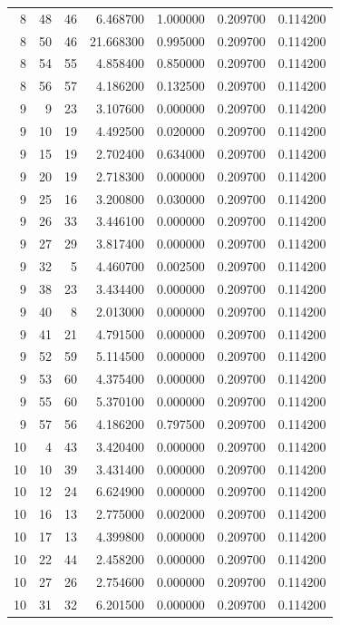 \begin{table}
\begin{tabular}{rrrrrrr}
8 & 48 & 46 & 6.468700 & 1.000000 & 0.209700 & 0.114200 \\
8 & 50 & 46 & 21.668300 & 0.995000 & 0.209700 & 0.114200 \\
8 & 54 & 55 & 4.858400 & 0.850000 & 0.209700 & 0.114200 \\
8 & 56 & 57 & 4.186200 & 0.132500 & 0.209700 & 0.114200 \\
9 & 9 & 23 & 3.107600 & 0.000000 & 0.209700 & 0.114200 \\
9 & 10 & 19 & 4.492500 & 0.020000 & 0.209700 & 0.114200 \\
9 & 15 & 19 & 2.702400 & 0.634000 & 0.209700 & 0.114200 \\
9 & 20 & 19 & 2.718300 & 0.000000 & 0.209700 & 0.114200 \\
9 & 25 & 16 & 3.200800 & 0.030000 & 0.209700 & 0.114200 \\
9 & 26 & 33 & 3.446100 & 0.000000 & 0.209700 & 0.114200 \\
9 & 27 & 29 & 3.817400 & 0.000000 & 0.209700 & 0.114200 \\
9 & 32 & 5 & 4.460700 & 0.002500 & 0.209700 & 0.114200 \\
9 & 38 & 23 & 3.434400 & 0.000000 & 0.209700 & 0.114200 \\
9 & 40 & 8 & 2.013000 & 0.000000 & 0.209700 & 0.114200 \\
9 & 41 & 21 & 4.791500 & 0.000000 & 0.209700 & 0.114200 \\
9 & 52 & 59 & 5.114500 & 0.000000 & 0.209700 & 0.114200 \\
9 & 53 & 60 & 4.375400 & 0.000000 & 0.209700 & 0.114200 \\
9 & 55 & 60 & 5.370100 & 0.000000 & 0.209700 & 0.114200 \\
9 & 57 & 56 & 4.186200 & 0.797500 & 0.209700 & 0.114200 \\
10 & 4 & 43 & 3.420400 & 0.000000 & 0.209700 & 0.114200 \\
10 & 10 & 39 & 3.431400 & 0.000000 & 0.209700 & 0.114200 \\
10 & 12 & 24 & 6.624900 & 0.000000 & 0.209700 & 0.114200 \\
10 & 16 & 13 & 2.775000 & 0.002000 & 0.209700 & 0.114200 \\
10 & 17 & 13 & 4.399800 & 0.000000 & 0.209700 & 0.114200 \\
10 & 22 & 44 & 2.458200 & 0.000000 & 0.209700 & 0.114200 \\
10 & 27 & 26 & 2.754600 & 0.000000 & 0.209700 & 0.114200 \\
10 & 31 & 32 & 6.201500 & 0.000000 & 0.209700 & 0.114200 \\

\end{tabular}
\end{table}
